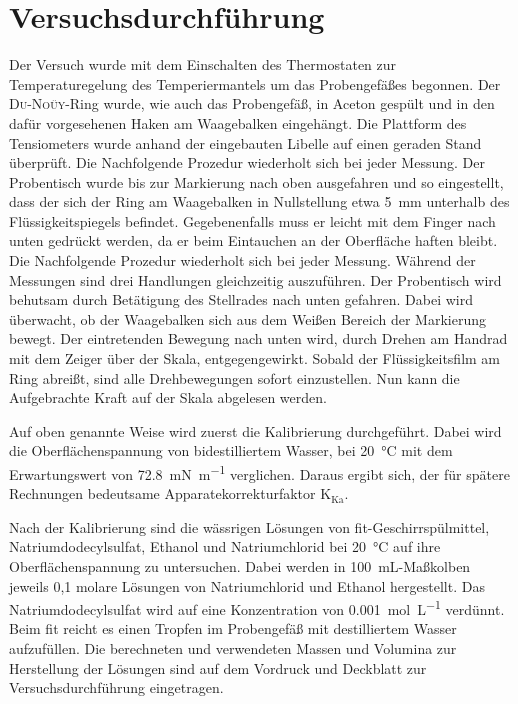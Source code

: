 \section{Versuchsdurchführung}
\label{sec:durchfuerung}

Der Versuch wurde mit dem Einschalten des Thermostaten zur Temperaturegelung des Temperiermantels um das Probengefäßes begonnen. Der \textsc{Du-Noüy}-Ring wurde, wie auch das Probengefäß, in Aceton gespült und in den dafür vorgesehenen Haken am Waagebalken eingehängt. Die Plattform des Tensiometers wurde anhand der eingebauten Libelle auf einen geraden Stand überprüft.  Die Nachfolgende Prozedur wiederholt sich bei jeder Messung. 
Der Probentisch wurde bis zur Markierung nach oben ausgefahren und so eingestellt, dass der sich der Ring am Waagebalken in Nullstellung  etwa \SI{5}{\milli\meter} unterhalb des Flüssigkeitspiegels befindet. Gegebenenfalls muss er leicht mit dem Finger nach unten gedrückt werden, da er beim Eintauchen an der Oberfläche haften bleibt. Die Nachfolgende Prozedur wiederholt sich bei jeder Messung. Während der Messungen sind drei Handlungen gleichzeitig auszuführen. Der Probentisch wird behutsam durch Betätigung des Stellrades nach unten gefahren. Dabei wird überwacht, ob der Waagebalken sich aus dem Weißen Bereich der Markierung bewegt. Der eintretenden Bewegung nach unten wird, durch Drehen am Handrad mit dem Zeiger über der Skala, entgegengewirkt. Sobald der Flüssigkeitsfilm am Ring abreißt, sind alle Drehbewegungen sofort einzustellen. Nun kann die Aufgebrachte Kraft auf der Skala abgelesen werden.

Auf oben genannte Weise wird zuerst die Kalibrierung durchgeführt. Dabei wird die Oberflächenspannung von bidestilliertem Wasser, bei \SI{20}{\degreeCelsius} mit dem Erwartungswert von \SI{72,8}{\milli\newton\per\meter} verglichen. Daraus ergibt sich, der für spätere Rechnungen bedeutsame Apparatekorrekturfaktor K$_{\text{Ka}}$.

Nach der Kalibrierung sind die wässrigen Lösungen von fit-Geschirrspülmittel, Natriumdodecylsulfat, Ethanol und Natriumchlorid bei \SI{20}{\degreeCelsius} auf ihre Oberflächenspannung zu untersuchen. Dabei werden in \SI{100}{\milli\liter}-Maßkolben jeweils 0,1 molare Lösungen von Natriumchlorid und Ethanol hergestellt. Das Natriumdodecylsulfat wird auf eine Konzentration von \SI{0,001}{\mole\per\liter} verdünnt. Beim fit reicht es einen Tropfen im Probengefäß mit destilliertem Wasser aufzufüllen. Die berechneten und verwendeten Massen und Volumina zur Herstellung der Lösungen sind auf dem Vordruck und Deckblatt zur Versuchsdurchführung eingetragen. 

